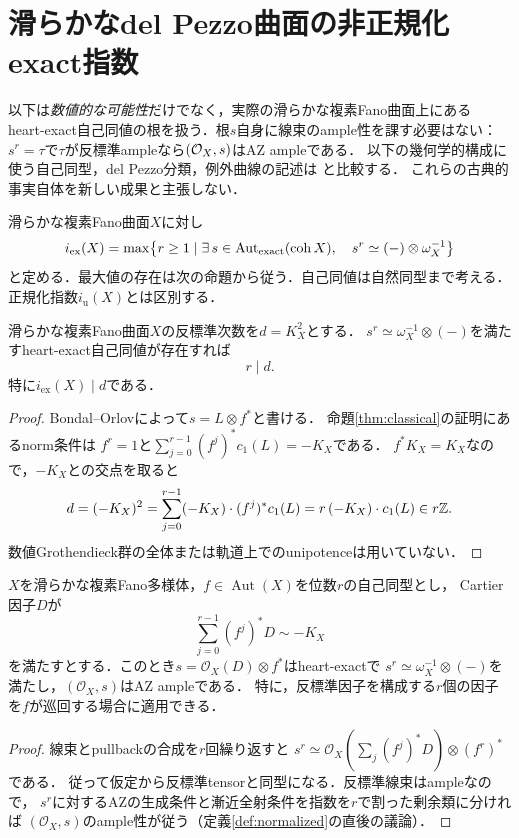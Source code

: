 \documentclass[11pt,a4paper]{ltjsarticle}
\begin{document}
\section{滑らかなdel Pezzo曲面の非正規化exact指数}\label{sec:delpezzo-exact}

以下は\emph{数値的な可能性}だけでなく，実際の滑らかな複素Fano曲面上にある
heart-exact自己同値の根を扱う．根$s$自身に線束のample性を課す必要はない：
$s^r=\tau$で$\tau$が反標準ampleなら$(\mathcal O_X,s)$はAZ ampleである．
以下の幾何学的構成に使う自己同型，del Pezzo分類，例外曲線の記述は
\cite{DolgachevMartin,BauerCatanese,Rieken}と比較する．
これらの古典的事実自体を新しい成果と主張しない．

\begin{definition}[非正規化exact指数]\label{def:exact-index-surface}
滑らかな複素Fano曲面$X$に対し
\[
 i_{\mathrm{ex}}(X)=\max\bigl\{r\ge1\mid
 \exists\,s\in\operatorname{Aut}_{\mathrm{exact}}(\operatorname{coh} X),\quad
 s^r\simeq(-)\otimes\omega_X^{-1}\bigr\}
\]
と定める．最大値の存在は次の命題から従う．自己同値は自然同型まで考える．
正規化指数$i_{\mathrm u}(X)$とは区別する．
\end{definition}

\begin{proposition}[反標準次数による普遍的上界]\label{prop:geometric-exact-degree-bound}
滑らかな複素Fano曲面$X$の反標準次数を$d=K_X^2$とする．
$s^r\simeq\omega_X^{-1}\otimes(-)$を満たすheart-exact自己同値が存在すれば
\[
 \boxed{\quad r\mid d.\quad}
\]
特に$i_{\mathrm{ex}}(X)\mid d$である．
\end{proposition}
\begin{proof}
Bondal--Orlov\cite[Theorem 3.1]{BO}によって$s=L\otimes f^*$と書ける．
命題\ref{thm:classical}の証明にあるnorm条件は
$f^r=1$と$\sum_{j=0}^{r-1}(f^j)^*c_1(L)=-K_X$である．
$f^*K_X=K_X$なので，$-K_X$との交点を取ると
\[
 d=(-K_X)^2
 =\sum_{j=0}^{r-1}(-K_X)\cdot (f^j)^*c_1(L)
 =r\,(-K_X)\cdot c_1(L)\in r\mathbb Z.
\]
数値Grothendieck群の全体または軌道上でのunipotenceは用いていない．
\end{proof}

\begin{lemma}[巡回する反標準因子]\label{lem:cyclic-anticanonical-boundary}
$X$を滑らかな複素Fano多様体，$f\in\operatorname{Aut}(X)$を位数$r$の自己同型とし，
Cartier因子$D$が
\[
 \sum_{j=0}^{r-1}(f^j)^*D\sim-K_X
\]
を満たすとする．このとき$s=\mathcal O_X(D)\otimes f^*$はheart-exactで
$s^r\simeq\omega_X^{-1}\otimes(-)$を満たし，$(\mathcal O_X,s)$はAZ ampleである．
特に，反標準因子を構成する$r$個の因子を$f$が巡回する場合に適用できる．
\end{lemma}
\begin{proof}
線束とpullbackの合成を$r$回繰り返すと
$s^r\simeq\mathcal O_X(\sum_j(f^j)^*D)\otimes(f^r)^*$である．
従って仮定から反標準tensorと同型になる．反標準線束はampleなので，
$s^r$に対するAZの生成条件と漸近全射条件を指数を$r$で割った剰余類に分ければ
$(\mathcal O_X,s)$のample性が従う（定義\ref{def:normalized}の直後の議論）．
\end{proof}
\end{document}
